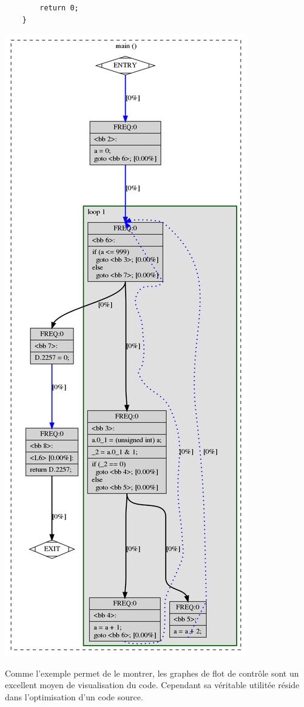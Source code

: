 \begin{multicols}{2}
\begin{lstlisting}
        return 0;
    }
\end{lstlisting}
\begin{center}
    \includegraphics[scale=0.23]{graph.png}
\end{center}
\end{multicols}
Comme l'exemple permet de le montrer, les graphes de flot de contrôle sont un excellent moyen de visualisation du code. Cependant sa véritable utilitée réside dans l'optimisation d'un code source.

